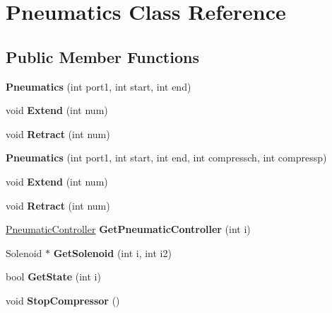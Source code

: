 \hypertarget{class_pneumatics}{\section{Pneumatics Class Reference}
\label{class_pneumatics}
}
\subsection*{Public Member Functions}
\begin{DoxyCompactItemize}
\item 
\hypertarget{class_pneumatics_a1b76e960a17e491d97ea7767ad2b389a}{{\bfseries Pneumatics} (int port1, int start, int end)}\label{class_pneumatics_a1b76e960a17e491d97ea7767ad2b389a}

\item 
\hypertarget{class_pneumatics_a82b412ea457d2eec590200d9dd04da19}{void {\bfseries Extend} (int num)}\label{class_pneumatics_a82b412ea457d2eec590200d9dd04da19}

\item 
\hypertarget{class_pneumatics_a21e16ac50d4963cb892243e1bf052f7a}{void {\bfseries Retract} (int num)}\label{class_pneumatics_a21e16ac50d4963cb892243e1bf052f7a}

\item 
\hypertarget{class_pneumatics_a69de5c31a4aba8e8b1527de4daffc3f4}{{\bfseries Pneumatics} (int port1, int start, int end, int compressch, int compressp)}\label{class_pneumatics_a69de5c31a4aba8e8b1527de4daffc3f4}

\item 
\hypertarget{class_pneumatics_a82b412ea457d2eec590200d9dd04da19}{void {\bfseries Extend} (int num)}\label{class_pneumatics_a82b412ea457d2eec590200d9dd04da19}

\item 
\hypertarget{class_pneumatics_a21e16ac50d4963cb892243e1bf052f7a}{void {\bfseries Retract} (int num)}\label{class_pneumatics_a21e16ac50d4963cb892243e1bf052f7a}

\item 
\hypertarget{class_pneumatics_a80c6272cbd91295533d9d23ff3da3196}{\hyperlink{class_pneumatic_controller}{Pneumatic\-Controller} {\bfseries Get\-Pneumatic\-Controller} (int i)}\label{class_pneumatics_a80c6272cbd91295533d9d23ff3da3196}

\item 
\hypertarget{class_pneumatics_ac09ac770e54942604c90cf7a0e13c4c4}{Solenoid $\ast$ {\bfseries Get\-Solenoid} (int i, int i2)}\label{class_pneumatics_ac09ac770e54942604c90cf7a0e13c4c4}

\item 
\hypertarget{class_pneumatics_ac5161f50f53ab9450416df347f5a359f}{bool {\bfseries Get\-State} (int i)}\label{class_pneumatics_ac5161f50f53ab9450416df347f5a359f}

\item 
\hypertarget{class_pneumatics_acdb72cee406f3c5a516cc74468738642}{void {\bfseries Stop\-Compressor} ()}\label{class_pneumatics_acdb72cee406f3c5a516cc74468738642}

\end{DoxyCompactItemize}


